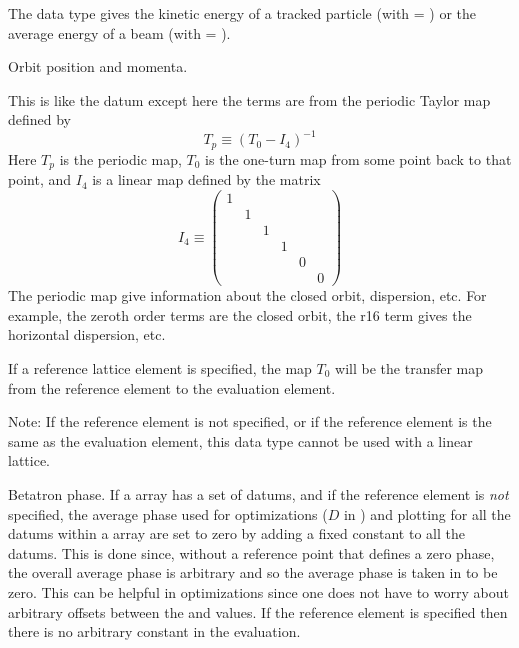 \begin{description}
{{{{{{  %
  \item[orbit.kinetic] \Newline {}
The  data type gives the kinetic energy of a tracked particle (with
 = ) or the average energy of a beam (with  =
).

  \item[orbit.x, .y, .z, .px, .py, .pz] \Newline {}
Orbit position and momenta.

  \item[periodic.tt.$ijklm\ldots$ \hspace{0.2in} $1 \le i,j,k,\ldots \le 6$] \Newline {}
This is like the  datum except here the terms are from the
periodic Taylor map defined by
\begin{equation}
  T_p \equiv (T_0 - I_4)^{-1}
\end{equation}
Here $T_p$ is the
periodic map, $T_0$ is the one-turn map from some point back to that
point, and $I_4$ is a linear map defined by the matrix
\begin{equation}
  I_4 \equiv 
    \begin{pmatrix}
      1 &   &   &   &   &   \\
        & 1 &   &   &   &   \\
        &   & 1 &   &   &   \\
        &   &   & 1 &   &   \\
        &   &   &   & 0 &   \\
        &   &   &   &   & 0
    \end{pmatrix}
\end{equation}
The periodic map give information about the closed orbit, dispersion,
etc. For example, the zeroth order terms are the closed orbit, the r16
term gives the horizontal dispersion, etc.

If a reference lattice element is specified, the map $T_0$ will be
the transfer map from the reference element to the evaluation element.

Note: If the reference element is not specified, or if the reference
element is the same as the evaluation element, this data type cannot
be used with a linear lattice.

  \item[phase.a, .b] \Newline {}
Betatron phase.  If a  array has a set of
 datums, and if the reference element is {\em not}
specified, the average phase used for optimizations ($D$ in
) and plotting for all the datums within a 
array are set to zero by adding a fixed constant to all the datums.
This is done since, without a reference point that defines a zero
phase, the overall average phase is arbitrary and so the average phase
is taken in \tao to be zero. This can be helpful in optimizations
since one does not have to worry about arbitrary offsets between the
 and  values. If the reference element is
specified then there is no arbitrary constant in the evaluation.

}}}}}}
\end{description}
